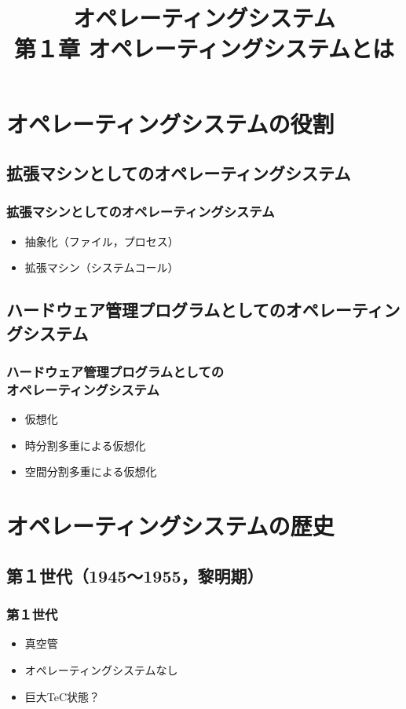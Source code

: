 \documentclass[nomag]{beamer}                   %
\begin{document}
\title[OS]{オペレーティングシステム\\第１章 オペレーティングシステムとは}
\date{}

\begin{frame}
  \titlepage
\end{frame}


\section{オペレーティングシステムの役割}
\subsection{拡張マシンとしてのオペレーティングシステム}
\begin{frame}
  \frametitle{拡張マシンとしてのオペレーティングシステム}
  \begin{itemize}
    \item 抽象化（ファイル，プロセス）
    \item 拡張マシン（システムコール）
  \end{itemize}
\end{frame}

\subsection{ハードウェア管理プログラムとしてのオペレーティングシステム}
\begin{frame}
  \frametitle{ハードウェア管理プログラムとしての\\オペレーティングシステム}
  \begin{itemize}
    \item 仮想化
    \item 時分割多重による仮想化
    \item 空間分割多重による仮想化
  \end{itemize}
\end{frame}

\section{オペレーティングシステムの歴史}
\subsection{第１世代（1945〜1955，黎明期）}
\begin{frame}
  \frametitle{第１世代}
  \begin{itemize}
    \item 真空管
    \item オペレーティングシステムなし
    \item 巨大TeC状態？
  \end{itemize}
\end{frame}
\end{document}
